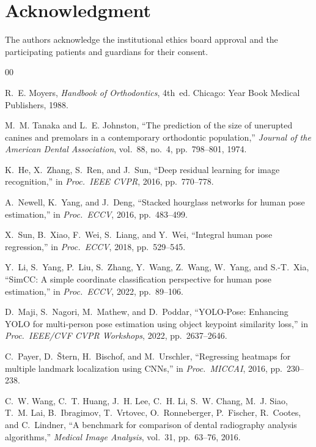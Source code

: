 \documentclass[conference]{IEEEtran}
\begin{document}
\section*{Acknowledgment}

The authors acknowledge the institutional ethics board approval and the participating patients
and guardians for their consent.

\begin{thebibliography}{00}

R.~E. Moyers, \textit{Handbook of Orthodontics}, 4th~ed.
Chicago: Year Book Medical Publishers, 1988.

M.~M. Tanaka and L.~E. Johnston,
``The prediction of the size of unerupted canines and premolars in a contemporary orthodontic
population,''
\textit{Journal of the American Dental Association}, vol.~88, no.~4, pp.~798--801, 1974.

K.~He, X.~Zhang, S.~Ren, and J.~Sun,
``Deep residual learning for image recognition,''
in \textit{Proc.\ IEEE CVPR}, 2016, pp.~770--778.

A.~Newell, K.~Yang, and J.~Deng,
``Stacked hourglass networks for human pose estimation,''
in \textit{Proc.\ ECCV}, 2016, pp.~483--499.

X.~Sun, B.~Xiao, F.~Wei, S.~Liang, and Y.~Wei,
``Integral human pose regression,''
in \textit{Proc.\ ECCV}, 2018, pp.~529--545.

Y.~Li, S.~Yang, P.~Liu, S.~Zhang, Y.~Wang, Z.~Wang, W.~Yang, and S.-T.~Xia,
``SimCC: A simple coordinate classification perspective for human pose estimation,''
in \textit{Proc.\ ECCV}, 2022, pp.~89--106.

D.~Maji, S.~Nagori, M.~Mathew, and D.~Poddar,
``YOLO-Pose: Enhancing YOLO for multi-person pose estimation using object keypoint similarity
loss,''
in \textit{Proc.\ IEEE/CVF CVPR Workshops}, 2022, pp.~2637--2646.

C.~Payer, D.~\v{S}tern, H.~Bischof, and M.~Urschler,
``Regressing heatmaps for multiple landmark localization using CNNs,''
in \textit{Proc.\ MICCAI}, 2016, pp.~230--238.

C.~W. Wang, C.~T. Huang, J.~H. Lee, C.~H. Li, S.~W. Chang, M.~J. Siao, T.~M. Lai,
B.~Ibragimov, T.~Vrtovec, O.~Ronneberger, P.~Fischer, R.~Cootes, and C.~Lindner,
``A benchmark for comparison of dental radiography analysis algorithms,''
\textit{Medical Image Analysis}, vol.~31, pp.~63--76, 2016.


\end{thebibliography}
\end{document}
